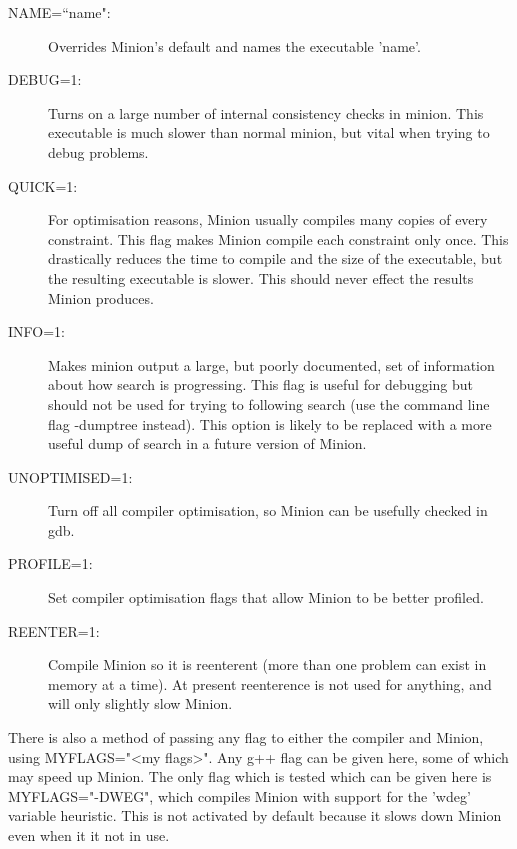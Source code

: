 \documentclass{article}
\begin{document}
\begin{description}
\item[NAME=``name":] Overrides Minion's default and names the executable 'name'.
\item[DEBUG=1:] Turns on a large number of internal consistency checks in minion. This executable is much slower than normal minion, but vital when trying to debug problems.
\item[QUICK=1:] For optimisation reasons, Minion usually compiles many copies of every constraint. This flag makes Minion compile each constraint only once. This drastically reduces the time to compile and the size of the executable, but the resulting executable is slower. This should never effect the results Minion produces.
\item[INFO=1:] Makes minion output a large, but poorly documented, set of information about how search is progressing. This flag is useful for debugging but should not be used for trying to following search (use the command line flag -dumptree instead). This option is likely to be replaced with a more useful dump of search in a future version of Minion.
\item[UNOPTIMISED=1:] Turn off all compiler optimisation, so Minion can be usefully checked in gdb.
\item[PROFILE=1:] Set compiler optimisation flags that allow Minion to be better profiled.
\item[REENTER=1:] Compile Minion so it is reenterent (more than one problem can exist in memory at a time). At present reenterence is not used for anything, and will only slightly slow Minion.
\end{description}

There is also a method of passing any flag to either the compiler and Minion, using MYFLAGS="<my flags>". Any g++ flag can be given here, some of which may speed up Minion. The only flag which is tested which can be given here is MYFLAGS="-DWEG", which compiles Minion with support for the 'wdeg' variable heuristic. This is not activated by default because it slows down Minion even when it it not in use.
\end{document}
